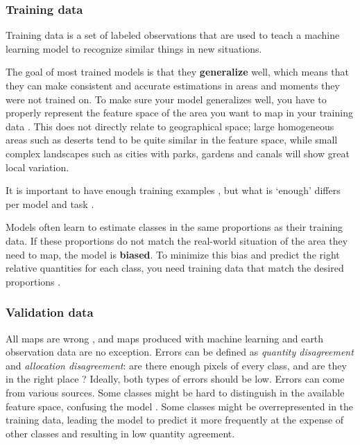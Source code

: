     \subsubsection{Training data}

        Training data is a set of labeled observations that are used to teach a machine learning model to recognize similar things in new situations. 
        
        The goal of most trained models is that they \textbf{generalize} well, which means that they can make consistent and accurate estimations in areas and moments they were not trained on. To make sure your model generalizes well, you have to properly represent the feature space of the area you want to map in your training data \citep{meyer2021predicting}. This does not directly relate to geographical space; large homogeneous areas such as deserts tend to be quite similar in the feature space, while small complex landscapes such as cities with parks, gardens and canals will show great local variation. 

        It is important to have enough training examples \citep{ramezan2021effects,rodriguez-perez2017influence,zhu2016optimizing}, but what is `enough' differs per model \citep{myburgh2014impact} and task \citep{koshute2021recommending}.
        
        Models often learn to estimate classes in the same proportions as their training data. If these proportions do not match the real-world situation of the area they need to map, the model is \textbf{biased}. To minimize this bias and predict the right relative quantities for each class, you need training data that match the desired proportions \citep{he2009learning, kleinewillinghofer2022unbiased}.
        
    \subsubsection{Validation data}

        All maps are wrong \citep{monmonier2018how}, and maps produced with machine learning and earth observation data are no exception. Errors can be defined as \textit{quantity disagreement} and \textit{allocation disagreement}: are there enough pixels of every class, and are they in the right place \citep{pontius2006can,pontius2011death}? Ideally, both types of errors should be low. Errors can come from various sources. Some classes might be hard to distinguish in the available feature space, confusing the model \citep{shivakumar2017spectral}. Some classes might be overrepresented in the training data, leading the model to predict it more frequently at the expense of other classes and resulting in low quantity agreement.


